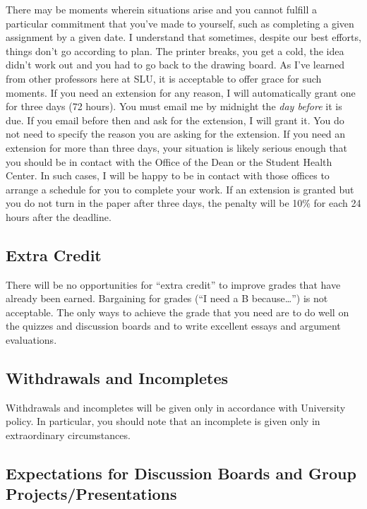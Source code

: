 \documentclass[11pt,]{article}
\begin{document}
There may be moments wherein situations arise and you cannot fulfill a
particular commitment that you've made to yourself, such as completing a
given assignment by a given date. I understand that sometimes, despite
our best efforts, things don't go according to plan. The printer breaks,
you get a cold, the idea didn't work out and you had to go back to the
drawing board. As I've learned from other professors here at SLU, it is
acceptable to offer grace for such moments. If you need an extension for
any reason, I will automatically grant one for three days (72 hours).
You must email me by midnight the \emph{day before} it is due. If you
email before then and ask for the extension, I will grant it. You do not
need to specify the reason you are asking for the extension. If you need
an extension for more than three days, your situation is likely serious
enough that you should be in contact with the Office of the Dean or the
Student Health Center. In such cases, I will be happy to be in contact
with those offices to arrange a schedule for you to complete your work.
If an extension is granted but you do not turn in the paper after three
days, the penalty will be 10\% for each 24 hours after the deadline.

\subsection{Extra Credit}\label{extra-credit}

There will be no opportunities for ``extra credit'' to improve grades
that have already been earned. Bargaining for grades (``I need a B
because\ldots{}'') is not acceptable. The only ways to achieve the grade
that you need are to do well on the quizzes and discussion boards and to
write excellent essays and argument evaluations.

\subsection{Withdrawals and
Incompletes}\label{withdrawals-and-incompletes}

Withdrawals and incompletes will be given only in accordance with
University policy. In particular, you should note that an incomplete is
given only in extraordinary circumstances.

\subsection{Expectations for Discussion Boards and Group
Projects/Presentations}\label{expectations-for-discussion-boards-and-group-projectspresentations}
\end{document}
